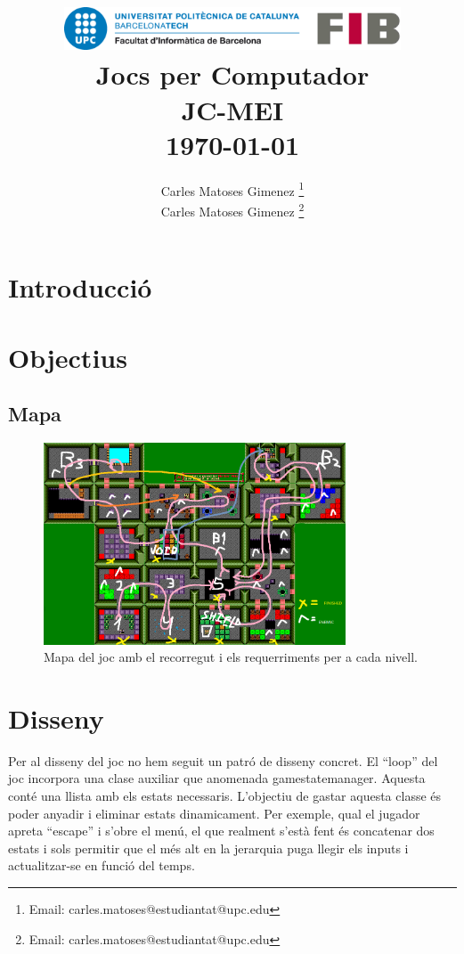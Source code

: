 \documentclass[a4paper,12pt]{article}
\title{
    \vspace{2cm} %
    \includegraphics[width=0.75\textwidth]{fib.png} \\ %
    \vspace{1cm} %
    \textbf{\Huge Jocs per Computador} \\
    \vspace{1cm} %
    \large JC-MEI \\
    \vspace{0.5cm} %
    \large \today
}
\author{
Carles Matoses Gimenez
    \thanks{
    Email: carles.matoses@estudiantat@upc.edu}\\
Carles Matoses Gimenez
    \thanks{
    Email: carles.matoses@estudiantat@upc.edu}\\
}
\date{
}
\begin{document}
\maketitle
\thispagestyle{empty}
\newpage

\setcounter{page}{1}  %
\tableofcontents
\newpage

\section{Introducció}

\section{Objectius}
\subsection{Mapa}
\begin{figure}[ht!]
    \centering
    \includegraphics[width=0.8\textwidth]{../imgs/recorregut.png} %
    \caption{Mapa del joc amb el recorregut i els requerriments per a  cada nivell.}
    \label{fig:mapa}
\end{figure}

\section{Disseny}
Per al disseny del joc no hem seguit un patró de disseny concret. El ``loop'' del joc incorpora una clase auxiliar que anomenada gamestatemanager. Aquesta conté una llista amb els estats necessaris. L'objectiu de gastar aquesta classe és poder anyadir i eliminar estats dinamicament. Per exemple, qual el jugador apreta ``escape'' i s'obre el menú, el que realment s'està fent és concatenar dos estats i sols permitir que el més alt en la jerarquia puga llegir els inputs i actualitzar-se en funció del temps. 
\end{document}
